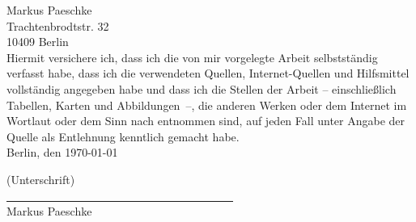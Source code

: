 \text{ }
\vspace{13.5cm}


Markus Paeschke\\
Trachtenbrodtstr. 32\\
10409 Berlin\\

Hiermit versichere ich, dass ich die von mir vorgelegte Arbeit selbstständig verfasst habe, dass ich die verwendeten Quellen, Internet-Quellen und Hilfsmittel vollständig angegeben habe und dass ich die Stellen der Arbeit -- einschließlich Tabellen, Karten und Abbildungen~--, die anderen Werken oder dem Internet im Wortlaut oder dem Sinn nach entnommen sind, auf jeden Fall unter Angabe der Quelle als Entlehnung kenntlich gemacht habe.\\

Berlin, den \today\\
\medskip
\medskip

(Unterschrift)\\
\underline{~~~~~~~~~~~~~~~~~~~~~~~~~~~~~~~~~~~~~~~~}\\
Markus Paeschke\\
